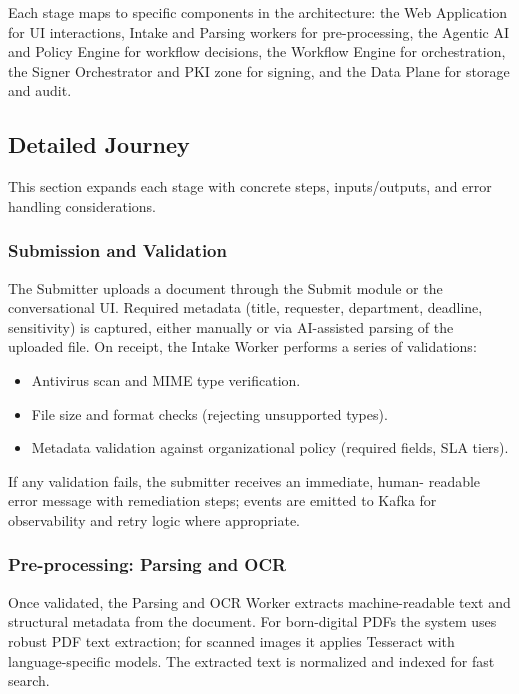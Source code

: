 \documentclass[12pt,oneside,openright,a4paper]{cpe-english-project}
\begin{document}
Each stage maps to specific components in the architecture: the Web
Application for UI interactions, Intake and Parsing workers for
pre-processing, the Agentic AI and Policy Engine for workflow
decisions, the Workflow Engine for orchestration, the Signer
Orchestrator and PKI zone for signing, and the Data Plane for storage
and audit.

\subsection{Detailed Journey}

This section expands each stage with concrete steps, inputs/outputs, and
error handling considerations.

\subsubsection{Submission and Validation}

The Submitter uploads a document through the Submit module or the
conversational UI. Required metadata (title, requester, department,
deadline, sensitivity) is captured, either manually or via AI-assisted
parsing of the uploaded file. On receipt, the Intake Worker performs a
series of validations:

\begin{itemize}
  \item Antivirus scan and MIME type verification.
  \item File size and format checks (rejecting unsupported types).
  \item Metadata validation against organizational policy (required
    fields, SLA tiers).
\end{itemize}

If any validation fails, the submitter receives an immediate, human-
readable error message with remediation steps; events are emitted to
Kafka for observability and retry logic where appropriate.

\subsubsection{Pre-processing: Parsing and OCR}

Once validated, the Parsing and OCR Worker extracts machine-readable
text and structural metadata from the document. For born-digital PDFs
the system uses robust PDF text extraction; for scanned images it
applies Tesseract with language-specific models. The extracted text is
normalized and indexed for fast search.
\end{document}
